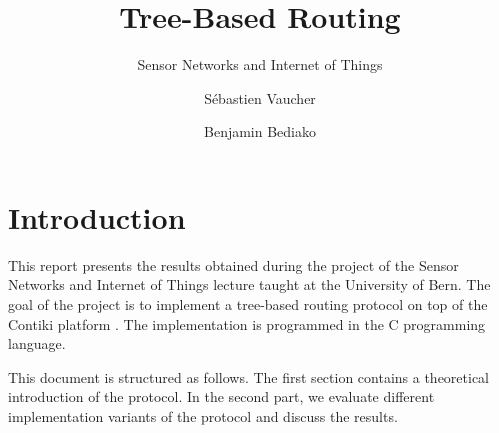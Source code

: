 \documentclass[a4paper]{llncs}
\begin{document}
\title{Tree-Based Routing}


\subtitle{Sensor Networks and Internet of Things}

\author{Sébastien Vaucher \and Benjamin Bediako}






\maketitle
\thispagestyle{plain}

\section{Introduction}

This report presents the results obtained during the project of the Sensor Networks and Internet of Things lecture taught at the University of Bern.
The goal of the project is to implement a tree-based routing protocol on top of the Contiki platform \autocite{contiki}.
The implementation is programmed in the C programming language.

This document is structured as follows.
The first section contains a theoretical introduction of the protocol.
In the second part, we evaluate different implementation variants of the protocol and discuss the results.
\end{document}
